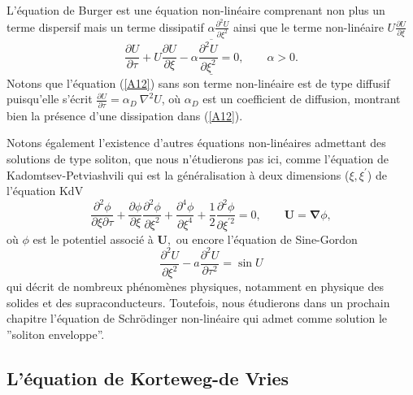 \documentclass[10pt,thmsa]{article}
\begin{document}
L'\'{e}quation de Burger est une \'{e}quation non-lin\'{e}aire comprenant non
plus un terme dispersif mais un terme dissipatif $\alpha\frac{\partial^{2}%
U}{\partial\xi^{2}}$ ainsi que le terme non-lin\'{e}aire $U\frac{\partial
U}{\partial\xi}$
\begin{equation}
\overline{\underline{\frac{\partial U}{\partial\tau}+U\frac{\partial
U}{\partial\xi}-\alpha\frac{\partial^{2}U}{\partial\xi^{2}}=0,\qquad\alpha
>0.}}\label{A12}%
\end{equation}
Notons que l'\'{e}quation (\ref{A12}) sans son terme non-lin\'{e}aire est de
type diffusif puisqu'elle s'\'{e}crit $\frac{\partial U}{\partial\tau}%
=\alpha_{D}\ \nabla^{2}U$, o\`{u} $\alpha_{D}$ est un coefficient de
diffusion, montrant bien la pr\'{e}sence d'une dissipation dans (\ref{A12}).

Notons \'{e}galement l'existence d'autres \'{e}quations non-lin\'{e}aires
admettant des solutions de type soliton, que nous n'\'{e}tudierons pas ici,
comme l'\'{e}quation de Kadomtsev-Petviashvili qui est la
g\'{e}n\'{e}ralisation \`{a} deux dimensions ($\xi,\xi^{\prime}$) de
l'\'{e}quation KdV
\begin{equation}
\frac{\partial^{2}\phi}{\partial\xi\partial\tau}+\frac{\partial\phi}%
{\partial\xi}\frac{\partial^{2}\phi}{\partial\xi^{2}}+\frac{\partial^{4}\phi
}{\partial\xi^{4}}+\frac{1}{2}\frac{\partial^{2}\phi}{\partial\xi^{\prime2}%
}=0,\qquad\mathbf{U}=\mathbf{\nabla}\phi,\label{AB12}%
\end{equation}
o\`{u} $\phi$ est le potentiel associ\'{e} \`{a} $\mathbf{U,}$ ou encore
l'\'{e}quation de Sine-Gordon
\begin{equation}
\frac{\partial^{2}U}{\partial\xi^{2}}-a\frac{\partial^{2}U}{\partial\tau^{2}%
}=\sin U\label{AA12}%
\end{equation}
qui d\'{e}crit de nombreux ph\'{e}nom\`{e}nes physiques, notamment en physique
des solides et des supraconducteurs. Toutefois, nous \'{e}tudierons dans un
prochain chapitre l'\'{e}quation de Schr\"{o}dinger non-lin\'{e}aire qui admet
comme solution le \textquotedblright soliton enveloppe\textquotedblright.

\subsection{L'\'{e}quation de Korteweg-de Vries}
\end{document}
